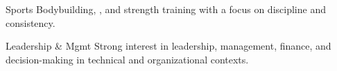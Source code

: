 

\begin{cvskills}

  \cvskill
    {Sports} %
    {Bodybuilding, , and strength training with a focus on discipline and consistency.} %

  \cvskill
    {Leadership \& Mgmt} %
    {Strong interest in leadership, management, finance, and decision-making in technical and organizational contexts.} %


\end{cvskills}